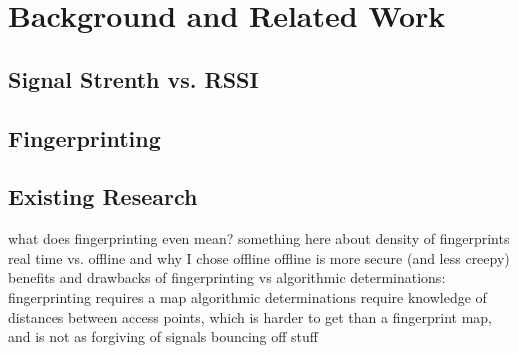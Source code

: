 \chapter{Background and Related Work}
\label{related}
%

\section{Signal Strenth vs. RSSI}
%

\section{Fingerprinting}
%

\section{Existing Research}

what does fingerprinting even mean?
something here about density of fingerprints
real time vs. offline and why I chose offline
	offline is more secure (and less creepy) 
benefits and drawbacks of fingerprinting vs algorithmic determinations:
	fingerprinting requires a map
	algorithmic determinations require knowledge of distances between access points, which is harder to get than a fingerprint map, and is not as forgiving of signals bouncing off stuff
	

